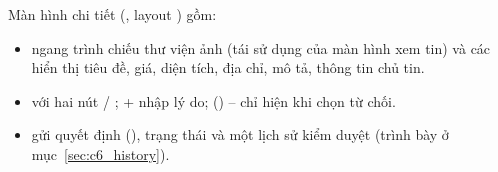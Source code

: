 Màn hình chi tiết (, layout
) gồm:
\begin{itemize}
    \item {} ngang trình chiếu thư viện ảnh (tái sử dụng
     của màn hình xem tin) và các  hiển
    thị tiêu đề, giá, diện tích, địa chỉ, mô tả, thông tin chủ tin.
    \item {} với hai nút  /
    ;  +  nhập lý
    do;  ()  -- chỉ hiện khi chọn từ chối.
    \item {} gửi quyết định (),
     trạng thái và một  lịch sử kiểm duyệt
    (trình bày ở mục~\ref{sec:c6_history}).
\end{itemize}


